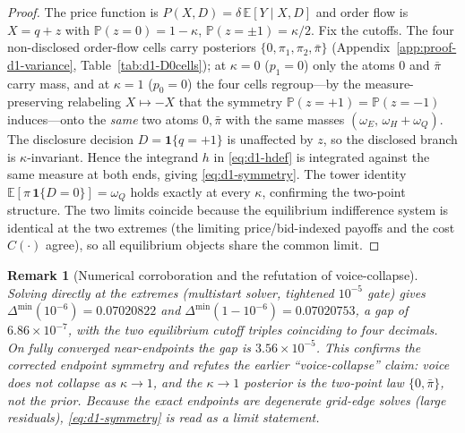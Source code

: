 \documentclass[11pt]{article}
\newcommand{\E}{\mathbb{E}}
\newcommand{\PP}{\mathbb{P}}
\newcommand{\1}{\mathbf{1}}
\newtheorem{remark}{Remark}
\begin{document}
\begin{proof}
The price function is $P(X,D)=\delta\,\E[Y\mid X,D]$ and order flow is $X=q+z$
with $\PP(z=0)=1-\kappa$, $\PP(z=\pm1)=\kappa/2$. Fix the cutoffs. The four
non-disclosed order-flow cells carry posteriors $\{0,\pi_1,\pi_2,\bar\pi\}$
(Appendix~\ref{app:proof-d1-variance}, Table~\ref{tab:d1-D0cells}); at $\kappa=0$
($p_1=0$) only the atoms $0$ and $\bar\pi$ carry mass, and at $\kappa=1$ ($p_0=0$)
the four cells regroup---by the measure-preserving relabeling $X\mapsto-X$ that
the symmetry $\PP(z=+1)=\PP(z=-1)$ induces---onto the \emph{same} two atoms
$0,\bar\pi$ with the same masses $(\omega_E,\,\omega_H+\omega_Q)$. The disclosure
decision $D=\1\{q=+1\}$ is unaffected by $z$, so the disclosed branch is
$\kappa$-invariant. Hence the integrand $h$ in \eqref{eq:d1-hdef} is integrated
against the same measure at both ends, giving \eqref{eq:d1-symmetry}. The tower
identity $\E[\pi\,\1\{D=0\}]=\omega_Q$ holds exactly at every $\kappa$,
confirming the two-point structure. The two limits coincide because the
equilibrium indifference system is identical at the two extremes (the limiting
price/bid-indexed payoffs and the cost $C(\cdot)$ agree), so all equilibrium
objects share the common limit.
\end{proof}

\begin{remark}[Numerical corroboration and the refutation of voice-collapse]
Solving directly at the extremes (multistart solver, tightened $10^{-5}$ gate)
gives $\Delta^{\min}(10^{-6})=0.07020822$ and
$\Delta^{\min}(1-10^{-6})=0.07020753$, a gap of $6.86\times10^{-7}$, with the two
equilibrium cutoff triples coinciding to four decimals. On fully converged
near-endpoints the gap is $3.56\times10^{-5}$. This \emph{confirms} the corrected
endpoint symmetry and \emph{refutes} the earlier ``voice-collapse'' claim: voice
does not collapse as $\kappa\to1$, and the $\kappa\to1$ posterior is the two-point
law $\{0,\bar\pi\}$, not the prior. Because the exact endpoints are degenerate
grid-edge solves (large residuals), \eqref{eq:d1-symmetry} is read as a
\emph{limit} statement.
\end{remark}
\end{document}
